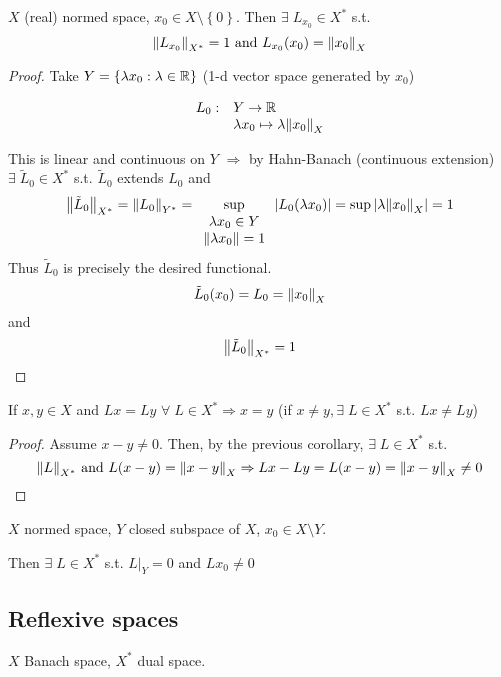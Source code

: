 \begin{corollary}
    \(X\) (real) normed space, \(x_0 \in X \setminus \left\{ 0 \right\}\).
    Then \(\exists \; L_{x_0} \in X^*\) s.t. 
    \[
        \norm{L_{x_0}}_{X^*} = 1 \mbox{ and } L_{x_0}(x_0) = \norm{x_0}_X
    \]
\end{corollary}
\begin{proof}
    Take \(Y = \left\{ \lambda x_0 : \lambda \in \mathbb{R} \right\}\) (1-d vector space generated by \(x_0\))  
    
    \[
        \begin{array}{rl}
            L_0: & Y \to \mathbb{R} \\
            & \lambda x_0 \mapsto \lambda \norm{x_0}_X
        \end{array}    
    \]

    This is linear and continuous on \(Y\) \(\Rightarrow\) by Hahn-Banach (continuous extension) \(\exists \; \tilde{L}_0 \in X^*\) s.t. \(\tilde{L}_0\) extends \(L_0\) and 
    \[
        \norm{\tilde{L}_0}_{X^*} = \norm{L_0}_{Y^*} = \sup_{\begin{array}{c}\lambda x_0 \in Y \\ \norm{\lambda x_0} = 1\end{array}}\abs{L_0(\lambda x_0)}= \sup \abs{\lambda \norm{x_0}_X} = 1
    \]
    Thus \(\tilde{L}_0\) is precisely the desired functional.
    \[
        \tilde{L}_0 (x_0) = L_0 = \norm{x_0}_X
    \]
    and 
    \[
        \norm{\tilde{L}_0}_{X^*} = 1
    \]
\end{proof}
\begin{corollary}
    If \(x,y \in X\) and \(Lx = Ly\) \(\forall \; L \in X^* \Rightarrow x = y\) (if \(x \neq y, \exists \; L \in X^*\) s.t. \(Lx \neq Ly\))
\end{corollary}
\begin{proof}
    Assume \(x-y \neq 0\). Then, by the previous corollary, \(\exists \; L \in X^*\) s.t. 
    \[
        \norm{L}_{X^*} \mbox{ and } L(x-y) = \norm{x-y}_X \Rightarrow Lx -Ly = L(x-y) = \norm{x-y}_X \neq 0
    \]
\end{proof}
\begin{corollary}
    \(X\) normed space, \(Y\) closed subspace of \(X\), \(x_0 \in X \setminus Y\). 

    Then \(\exists \; L \in X^*\) s.t. \(L\vert_Y = 0\) and \(L{x_0} \neq 0\)
\end{corollary}
\subsection*{Reflexive spaces}
\(X\) Banach space, \(X^*\) dual space.

